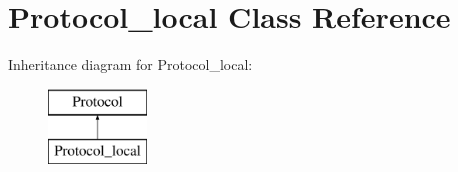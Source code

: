 \hypertarget{classProtocol__local}{}\section{Protocol\+\_\+local Class Reference}
\label{classProtocol__local}
Inheritance diagram for Protocol\+\_\+local\+:\begin{figure}[H]
\begin{center}
\leavevmode
\includegraphics[height=2.000000cm]{classProtocol__local}
\end{center}
\end{figure}
